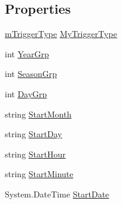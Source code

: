 \subsection*{Properties}
\begin{DoxyCompactItemize}
\item 
\hyperlink{class_p_a_z___dispersal_1_1_map_swap_trigger_a3767a96c305890046812ada41c4fce00}{m\-Trigger\-Type} \hyperlink{class_p_a_z___dispersal_1_1_map_swap_trigger_a31e74c468cc9652028cfcb24298628d8}{My\-Trigger\-Type}
\item 
int \hyperlink{class_p_a_z___dispersal_1_1_map_swap_trigger_a80369f151c45db45a66c9e87fa89a00e}{Year\-Grp}
\item 
int \hyperlink{class_p_a_z___dispersal_1_1_map_swap_trigger_aa4a3ea7ff9401ba1579296e7e0046bcf}{Season\-Grp}
\item 
int \hyperlink{class_p_a_z___dispersal_1_1_map_swap_trigger_a79cfd665c52eeca0852f34275593bc3f}{Day\-Grp}
\item 
string \hyperlink{class_p_a_z___dispersal_1_1_map_swap_trigger_a2a7e3c35f5b821a32884a69fb9642233}{Start\-Month}
\item 
string \hyperlink{class_p_a_z___dispersal_1_1_map_swap_trigger_a6e0996de1c63159e4ec4dba7e296f6c9}{Start\-Day}
\item 
string \hyperlink{class_p_a_z___dispersal_1_1_map_swap_trigger_ab4abf4c3d1555f4be0fab6ffd709023e}{Start\-Hour}
\item 
string \hyperlink{class_p_a_z___dispersal_1_1_map_swap_trigger_a4931952832d4d59c95688924f62bc909}{Start\-Minute}
\item 
System.\-Date\-Time \hyperlink{class_p_a_z___dispersal_1_1_map_swap_trigger_adde72eb1a514b670e0eef27ccb0d4f0e}{Start\-Date}

\end{DoxyCompactItemize}
